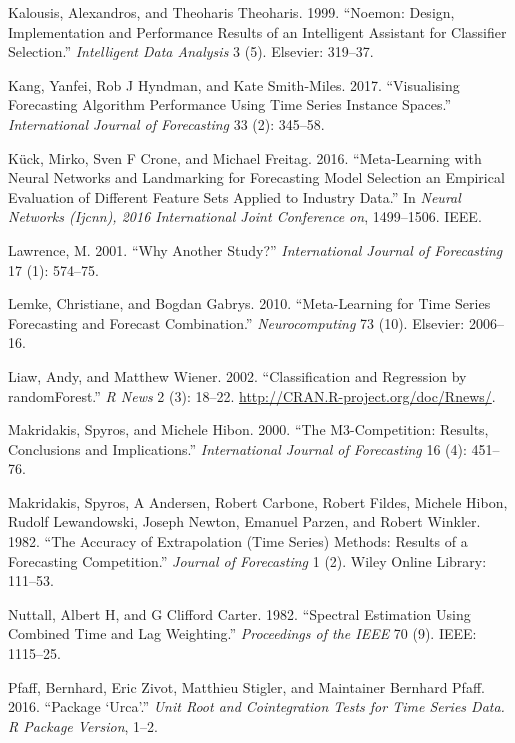 \documentclass[11pt,]{article}
\theoremstyle{definition}
\theoremstyle{definition}
\theoremstyle{definition}
\theoremstyle{remark}
\begin{document}
\hypertarget{ref-kalousis1999noemon}{}
Kalousis, Alexandros, and Theoharis Theoharis. 1999. ``Noemon: Design,
Implementation and Performance Results of an Intelligent Assistant for
Classifier Selection.'' \emph{Intelligent Data Analysis} 3 (5).
Elsevier: 319--37.

\hypertarget{ref-kang2017visualising}{}
Kang, Yanfei, Rob J Hyndman, and Kate Smith-Miles. 2017. ``Visualising
Forecasting Algorithm Performance Using Time Series Instance Spaces.''
\emph{International Journal of Forecasting} 33 (2): 345--58.

\hypertarget{ref-kuck2016meta}{}
Kück, Mirko, Sven F Crone, and Michael Freitag. 2016. ``Meta-Learning
with Neural Networks and Landmarking for Forecasting Model Selection an
Empirical Evaluation of Different Feature Sets Applied to Industry
Data.'' In \emph{Neural Networks (Ijcnn), 2016 International Joint
Conference on}, 1499--1506. IEEE.

\hypertarget{ref-lawrence2001s}{}
Lawrence, M. 2001. ``Why Another Study?'' \emph{International Journal of
Forecasting} 17 (1): 574--75.

\hypertarget{ref-lemke2010meta}{}
Lemke, Christiane, and Bogdan Gabrys. 2010. ``Meta-Learning for Time
Series Forecasting and Forecast Combination.'' \emph{Neurocomputing} 73
(10). Elsevier: 2006--16.

\hypertarget{ref-liaw2002randomforest}{}
Liaw, Andy, and Matthew Wiener. 2002. ``Classification and Regression by
randomForest.'' \emph{R News} 2 (3): 18--22.
\url{http://CRAN.R-project.org/doc/Rnews/}.

\hypertarget{ref-makridakis2000m3}{}
Makridakis, Spyros, and Michele Hibon. 2000. ``The M3-Competition:
Results, Conclusions and Implications.'' \emph{International Journal of
Forecasting} 16 (4): 451--76.

\hypertarget{ref-makridakis1982accuracy}{}
Makridakis, Spyros, A Andersen, Robert Carbone, Robert Fildes, Michele
Hibon, Rudolf Lewandowski, Joseph Newton, Emanuel Parzen, and Robert
Winkler. 1982. ``The Accuracy of Extrapolation (Time Series) Methods:
Results of a Forecasting Competition.'' \emph{Journal of Forecasting} 1
(2). Wiley Online Library: 111--53.

\hypertarget{ref-nuttall1982spectral}{}
Nuttall, Albert H, and G Clifford Carter. 1982. ``Spectral Estimation
Using Combined Time and Lag Weighting.'' \emph{Proceedings of the IEEE}
70 (9). IEEE: 1115--25.

\hypertarget{ref-pfaff2016package}{}
Pfaff, Bernhard, Eric Zivot, Matthieu Stigler, and Maintainer Bernhard
Pfaff. 2016. ``Package `Urca'.'' \emph{Unit Root and Cointegration Tests
for Time Series Data. R Package Version}, 1--2.
\end{document}
